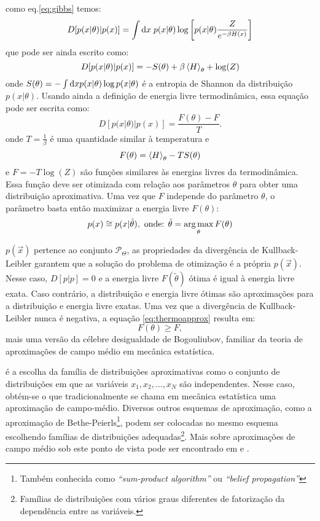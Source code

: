  como eq.\eqref{eq:gibbs} temos:
\begin{equation*}
 D[ p(x|\theta)|p(x) ] = \int \mathrm{d} x\; p(x|\theta) \log\left[p(x|\theta)\frac{Z}{e^{-\beta H(x)}}\right]
\end{equation*}
que pode ser ainda escrito como:
\[
 D[ p(x|\theta)|p(x) ] = - S(\theta)  + \beta \left\langle H \right\rangle_{\theta}  + \log(Z)
\]
onde $S(\theta) = - \int \mathrm{d} x p(x|\theta) \log p(x|\theta)$ é a entropia de Shannon da distribuição $p(x|\theta)$. Usando ainda a definição de energia livre termodinâmica, essa equação pode ser escrita como:
\begin{equation}
\label{eq:thermoapprox}
 D[ p(x|\theta)|p(x) ] = \dfrac{F(\theta) - F}{T}.
\end{equation}
onde $T = \frac{1}{\beta}$ é uma quantidade similar à temperatura e 
\begin{equation}
\label{eq:freenergy}
F(\theta) = \avg{H}_{\theta} - T S(\theta) 
\end{equation}
e $F = -T\log(Z)$ são funções similares às energias livres da termodinâmica. Essa função deve ser otimizada com relação aos parâmetros $\theta$ para obter uma distribuição aproximativa. Uma vez que $F$ independe do parâmetro $\theta$, o parâmetro basta então maximizar a energia livre $F(\theta)$:
\begin{equation}
p(x) \cong p(x | \tilde{\theta}), \text{   onde: } \tilde{\theta} = \operatorname*{arg\,max}_{\theta} F(\theta)
\end{equation}

 $p(\vec{x})$ pertence ao conjunto $\mathcal{P}_\Theta$, as propriedades da divergência de Kullback-Leibler garantem que a solução do problema de otimização é a própria $p(\vec{x})$. Nesse caso, $D[p|p] = 0$ e a energia livre $F(\tilde{\theta})$ ótima é igual à energia livre exata. Caso contrário, a distribuição e energia livre ótimas são aproximações para a distribuição e energia livre exatas. Uma vez que a divergência de Kullback-Leibler nunca é negativa, a equação \eqref{eq:thermoapprox} resulta em:
\begin{equation}
 \label{eq:bogouliubov}
  F(\theta) \ge F,
\end{equation}
mais uma versão da célebre desigualdade de Bogouliubov, familiar da teoria de aproximações de campo médio em mecânica estatística\cite{Salinas1997}.

 é a escolha da família de distribuições aproximativas como o conjunto de distribuições em que as variáveis $x_1, x_2, \ldots, x_N$ são independentes. Nesse caso, obtém-se o que tradicionalmente se chama em mecânica estatística uma aproximação de campo-médio. Diversos outros esquemas de aproximação, como a aproximação de Bethe-Peierls\footnote{Também conhecida como \emph{``sum-product algorithm''} ou \emph{``belief propagation''}}, podem ser colocadas no mesmo esquema escolhendo famílias de distribuições adequadas\footnote{Famílias de distribuições com vários graus diferentes de fatorização da dependência entre as variáveis.}. Mais sobre aproximações de campo médio sob este ponto de vista pode ser encontrado em \citet{Opper2001}\cite{Opper2001} e \citet{Mezard2009}\cite{Mezard2009}.

